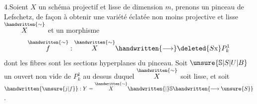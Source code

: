 4.\quad Soient $X$ un schéma projectif et lisse de dimension $m$, prenons un pinceau de Lefschetz, de façon à obtenir une variété éclatée non moins projective et lisse $\overset{\handwritten{\sim}}{X}$ et un morphisme
\[
\overset{\handwritten{\sim}}{f}:\overset{\handwritten{\sim}}{X}\handwritten{\longrightarrow}\deleted{S\mathrm{x}}P^1_k
\]
dont les fibres sont les sections hyperplanes du pinceau. Soit $\unsure{\mathbb{S}|S|U|B}$ un ouvert non vide de $P^1_k$ au dessus duquel $\overset{\handwritten{\sim}}{X}$ soit lisse, et soit $\handwritten{\unsure{j|f}}:Y=\overset{\handwritten{\sim}}{X}\handwritten{|}\mathbb{S}\handwritten{\longrightarrow\unsure{S}}$.
